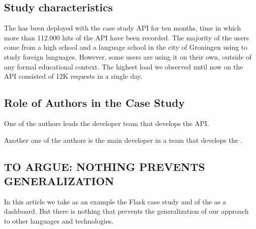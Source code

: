 \subsection*{Study characteristics}

The \tool has been deployed with the case study API for 
ten months, time in which more than 112.000 hits of the API have 
been recorded. 
The majority of the users come from a high school and a language school in the city of Groningen using \zee to study foreign languages. However, some users are using it on their own, outside of any formal educational context. The highest load we observed until now on the API consisted of 12K requests in a single day. 

\subsection*{Role of Authors in the Case Study}
One of the authors leads the developer team that develops the \zee API. 

Another one of the authors is the main developer in a team 
that develops the \tool. 


\subsection*{TO ARGUE: NOTHING PREVENTS GENERALIZATION}
In this article we take as an example the Flask case study
and of the \tool as a dashboard. 
But there is nothing that prevents the generalization of 
our approach to other languages and technologies.



